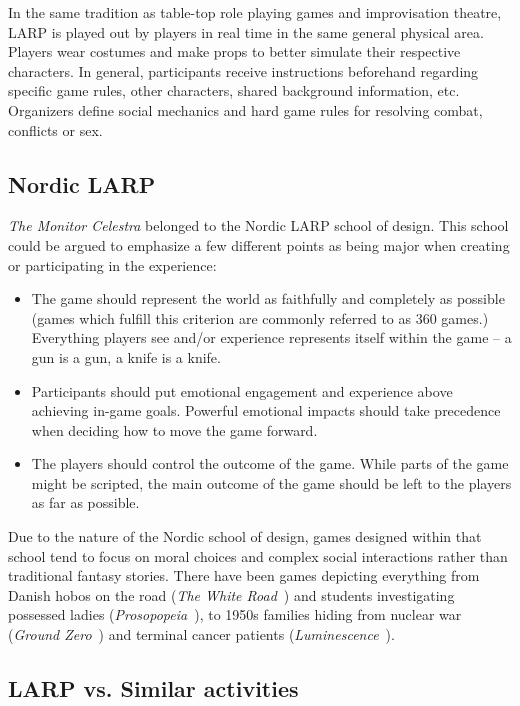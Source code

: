 In the same tradition as table-top role playing games and improvisation theatre, LARP is played out by players in real time in the same general physical area. Players wear costumes and make props to better simulate their respective characters. In general, participants receive instructions beforehand regarding specific game rules, other characters, shared background information, etc. Organizers define social mechanics and hard game rules for resolving combat, conflicts or sex. 

\subsection{Nordic LARP}

\emph{The Monitor Celestra} belonged to the Nordic LARP school of design. This school could be argued to emphasize a few different points as being major when creating or participating in the experience: 

\begin{itemize}
    \item The game should represent the world as faithfully and completely as possible (games which fulfill this criterion are commonly referred to as 360\degree{} games.) Everything players see and/or experience represents itself within the game -- a gun is a gun, a knife is a knife.
\item Participants should put emotional engagement and experience above achieving in-game goals. Powerful emotional impacts should take precedence when deciding how to move the game forward.
\item The players should control the outcome of the game. While parts of the game might be scripted, the main outcome of the game should be left to the players as far as possible.
\end{itemize}

Due to the nature of the Nordic school of design, games designed within that school tend to focus on moral choices and complex social interactions rather than traditional fantasy stories. There have been games depicting everything from Danish hobos on the road (\emph{The White Road}~\cite{pedersen2008}) and students investigating possessed ladies (\emph{Prosopopeia}~\cite{jonsson2006prosopopeia, montola2006prosopopeia}), to 1950s families hiding from nuclear war (\emph{Ground Zero}~\cite{nordiclarp}) and terminal cancer patients (\emph{Luminescence}~\cite{nordiclarp}).

\subsection{LARP vs. Similar activities}

